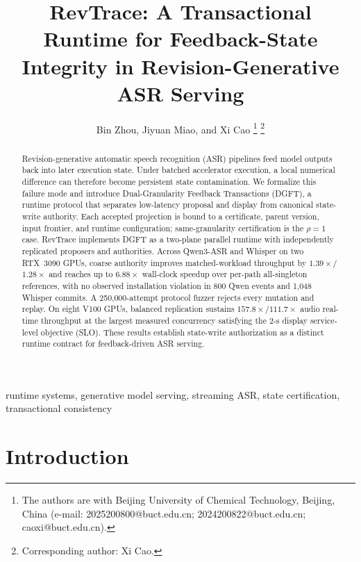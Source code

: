 \documentclass[journal,10pt]{IEEEtran}
\theoremstyle{remark}
\newcommand{\granratio}{\rho}
\begin{document}
\title{RevTrace: A Transactional Runtime for Feedback-State Integrity in
Revision-Generative ASR Serving}

\author{Bin Zhou, Jiyuan Miao, and Xi Cao
\thanks{The authors are with Beijing University of Chemical Technology,
Beijing, China (e-mail: 2025200800@buct.edu.cn;
2024200822@buct.edu.cn; caoxi@buct.edu.cn).}
\thanks{Corresponding author: Xi Cao.}}

\maketitle
{}

\begin{abstract}
Revision-generative automatic speech recognition (ASR) pipelines feed model
outputs back into later execution
state. Under batched accelerator execution, a local numerical difference can
therefore become persistent state contamination. We formalize this failure mode
and introduce Dual-Granularity Feedback Transactions (DGFT), a runtime protocol
that separates low-latency proposal and display from canonical state-write
authority. Each accepted projection is bound to a certificate, parent version,
input frontier, and runtime configuration; same-granularity certification is
the $\granratio=1$ case. RevTrace implements DGFT as a two-plane parallel
runtime with independently replicated proposers and authorities. Across
Qwen3-ASR and Whisper on two RTX~3090 GPUs, coarse authority improves
matched-workload throughput by $1.39\times$/$1.28\times$ and reaches up to
$6.88\times$ wall-clock speedup over per-path all-singleton references, with
no observed installation violation in
800 Qwen events and 1{,}048 Whisper commits. A 250{,}000-attempt protocol
fuzzer rejects every mutation and replay. On eight V100 GPUs, balanced
replication sustains $157.8\times$/$111.7\times$ audio real-time throughput at
the largest measured concurrency satisfying the 2-s display service-level
objective (SLO). These results establish
state-write authorization as a distinct runtime contract for feedback-driven
ASR serving.
\end{abstract}

\begin{IEEEkeywords}
runtime systems, generative model serving, streaming ASR, state certification,
transactional consistency
\end{IEEEkeywords}

\section{Introduction}\label{sec:intro}

\end{document}
